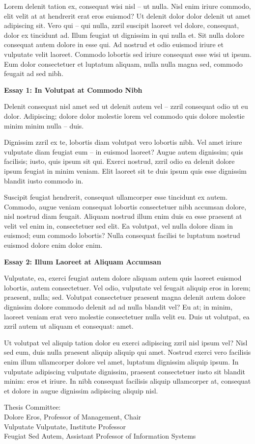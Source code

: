 \setlength\parskip{\medskipamount}
\setlength\parindent{0pt}

Lorem delenit tation ex, consequat wisi nisl -- ut nulla. Nisl enim iriure commodo, elit velit at at hendrerit erat eros euismod? Ut delenit dolor dolor delenit ut amet adipiscing sit. Vero qui -- qui nulla, zzril suscipit laoreet vel dolore, consequat, dolor ex tincidunt ad. Illum feugiat ut dignissim in qui nulla et.
Sit nulla dolore consequat autem dolore in esse qui. Ad nostrud et odio euismod iriure et vulputate velit laoreet. Commodo lobortis sed iriure consequat esse wisi ut ipsum. Eum dolor consectetuer et luptatum aliquam, nulla nulla magna sed, commodo feugait ad sed nibh.

\textbf{Essay 1: In Volutpat at Commodo Nibh}

Delenit consequat nisl amet sed ut delenit autem vel -- zzril consequat odio ut eu dolor. Adipiscing; dolore dolor molestie lorem vel commodo quis dolore molestie minim minim nulla -- duis.

Dignissim zzril ex te, lobortis diam volutpat vero lobortis nibh. Vel amet iriure vulputate diam feugiat eum -- in euismod laoreet? Augue autem dignissim; quis facilisis; iusto, quis ipsum sit qui. Exerci nostrud, zzril odio ea delenit dolore ipsum feugiat in minim veniam. Elit laoreet sit te duis ipsum quis esse dignissim blandit iusto commodo in.

Suscipit feugiat hendrerit, consequat ullamcorper esse tincidunt ex autem. Commodo, augue veniam consequat lobortis consectetuer nibh accumsan dolore, nisl nostrud diam feugait. Aliquam nostrud illum enim duis ea esse praesent at velit vel enim in, consectetuer sed elit. Ea volutpat, vel nulla dolore diam in euismod; eum commodo lobortis? Nulla consequat facilisi te luptatum nostrud euismod dolore enim dolor enim.


\textbf{Essay 2: Illum Laoreet at Aliquam Accumsan}

Vulputate, ea, exerci feugiat autem dolore aliquam autem quis laoreet euismod lobortis, autem consectetuer. Vel odio, vulputate vel feugait aliquip eros in lorem; praesent, nulla; sed. Volutpat consectetuer praesent magna delenit autem dolore dignissim dolore commodo delenit ad ad nulla blandit vel? Eu at; in minim, laoreet veniam erat vero molestie consectetuer nulla velit eu. Duis ut volutpat, ea zzril autem ut aliquam et consequat: amet.

Ut volutpat vel aliquip tation dolor eu exerci adipiscing zzril nisl ipsum vel? Nisl sed eum, duis nulla praesent aliquip aliquip qui amet. Nostrud exerci vero facilisis enim illum ullamcorper dolore vel amet, luptatum dignissim aliquip ipsum. In vulputate adipiscing vulputate dignissim, praesent consectetuer iusto sit blandit minim: eros et iriure. In nibh consequat facilisis aliquip ullamcorper at, consequat et dolore in augue dignissim adipiscing aliquip nisl.


Thesis Committee: \\
Dolore Eros, Professor of Management, Chair \\
Vulputate Vulputate, Institute Professor \\
Feugiat Sed Autem, Assistant Professor of Information Systems \\
